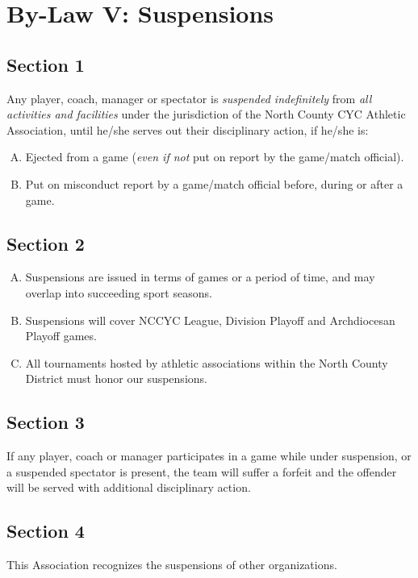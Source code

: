 \section{By-Law V: Suspensions}
\label{sec:bylaw-5}
\subsection{Section 1}
\label{ssec:bylaw-5-1}
Any player, coach, manager or spectator is {\em suspended indefinitely} from {\em all activities and facilities} under the jurisdiction of the North County CYC Athletic Association, until he/she serves out their disciplinary action, if he/she is:
\begin{enumerate}[A.]
    \item Ejected from a game ({\em even if not} put on report by the game/match official).
    \item Put on misconduct report by a game/match official before, during or after a game.
\end{enumerate}

\subsection{Section 2}
\label{ssec:bylaw-5-2}
\begin{enumerate}[A.]
    \item Suspensions are issued in terms of games or a period of time, and may overlap into succeeding sport seasons.
    \item Suspensions will cover NCCYC League, Division Playoff and Archdiocesan Playoff games.
    \item All tournaments hosted by athletic associations within the North County District must honor our suspensions.
\end{enumerate}

\subsection{Section 3}
\label{ssec:bylaw-5-3}
If any player, coach or manager participates in a game while under suspension, or a suspended spectator is present, the team will suffer a forfeit and the offender will be served with additional disciplinary action.

\subsection{Section 4}
\label{ssec:bylaw-5-4}
This Association recognizes the suspensions of other organizations.

